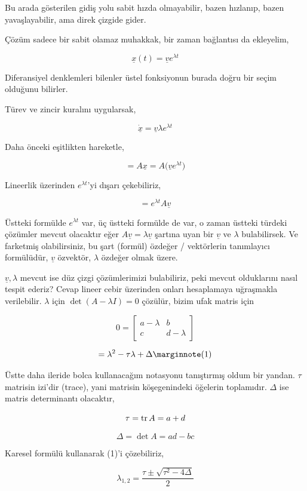 \documentclass[12pt,fleqn]{article}\usepackage{../../common}
\begin{document}
Bu arada gösterilen gidiş yolu sabit hızda olmayabilir, bazen hızlanıp, bazen
yavaşlayabilir, ama direk çizgide gider. 

Çözüm sadece bir sabit olamaz muhakkak, bir zaman bağlantısı da ekleyelim,

$$ \underline{x}(t) = \underline{v} e ^{\lambda t}  $$

Diferansiyel denklemleri bilenler üstel fonksiyonun burada doğru bir seçim
olduğunu bilirler. 

Türev ve zincir kuralını uygularsak,

$$
\dot{\underline{x}} = \underline{v} \lambda e ^{\lambda t} 
$$

Daha önceki eşitlikten hareketle,

$$ = A \underline{x} = A \big( \underline{v} e ^{\lambda t} \big) $$

Lineerlik üzerinden $e ^{\lambda t}$'yi dışarı çekebiliriz,

$$ = e ^{\lambda t} A \underline{v} $$

Üstteki formülde $e^{\lambda t}$ var, üç üstteki formülde de var, o zaman
üstteki türdeki çözümler mevcut olacaktır eğer $A
\underline{v}=\lambda\underline{v}$ şartına uyan bir $\underline{v}$ ve $\lambda$
bulabilirsek. Ve farketmiş olabilirsiniz, bu şart (formül) özdeğer / vektörlerin
tanımlayıcı formülüdür, $\underline{v}$ özvektör, $\lambda$ özdeğer olmak üzere.

$\underline{v},\lambda$ mevcut ise düz çizgi çözümlerimizi bulabiliriz, peki
mevcut olduklarını nasıl tespit ederiz? Cevap lineer cebir üzerinden onları
hesaplamaya uğraşmakla verilebilir. $\lambda$ için $\det (A - \lambda I) = 0$
çözülür, bizim ufak matris için

$$ 0 = \left[\begin{array}{rr}
a-\lambda & b \\ c & d-\lambda
\end{array}\right] $$

$$ 
= \lambda^2 - \tau \lambda + \Delta 
\mlabel{1} 
$$

Üstte daha ileride bolca kullanacağım notasyonu tanıştırmış oldum bir
yandan. $\tau$ matrisin izi'dir (trace), yani matrisin köşegenindeki öğelerin
toplamıdır. $\Delta$ ise matris determinantı olacaktır,

$$ \tau = \operatorname{tr} A = a + d$$

$$ \Delta = \det A = ad - bc $$

Karesel formülü kullanarak (1)'i çözebiliriz,

$$ \lambda_{1,2} = \frac{\tau \pm \sqrt{\tau^2-4\Delta}}{2} $$
\end{document}
